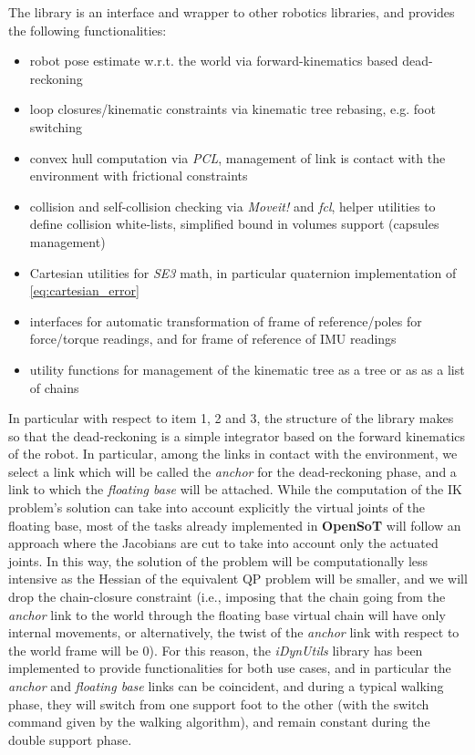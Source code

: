 The library is an interface and wrapper to other robotics libraries, and provides the following functionalities:
\begin{itemize}
\item robot pose estimate w.r.t. the world via forward-kinematics based dead-reckoning
\item loop closures/kinematic constraints via kinematic tree rebasing, e.g. foot switching
\item convex hull computation via \emph{PCL}, management of link is contact with the environment with frictional constraints
\item collision and self-collision checking via \emph{Moveit!} and \emph{fcl}, helper utilities to define collision white-lists, simplified bound in volumes support (capsules management)
\item Cartesian utilities for \emph{SE3} math, in particular quaternion implementation of \ref{eq:cartesian_error}
\item interfaces for automatic transformation of frame of reference/poles for force/torque readings, and for frame of reference of IMU readings
\item utility functions for management of the kinematic tree as a tree or as as a list of chains
\end{itemize}
In particular with respect to item 1, 2 and 3, the structure of the library makes so that the dead-reckoning is a simple integrator based on the forward kinematics of the robot.
In particular, among the links in contact with the environment, we select a link which will be called the  \emph{anchor} for the dead-reckoning phase, and a link to which the \emph{floating base} will be attached. While the computation of the IK problem's solution can take into account explicitly the virtual joints of the floating base, most of the tasks already implemented in \textbf{OpenSoT} will follow an approach where the Jacobians are cut to take into account only the actuated joints. In this way, the solution of the problem will be computationally less intensive as the Hessian of the equivalent QP problem will be smaller, and we will drop the chain-closure constraint (i.e., imposing that the chain going from the \emph{anchor} link to the world through the floating base virtual chain will have only internal movements, or alternatively, the twist of the \emph{anchor} link with respect to the world frame will be $0$). For this reason, the \emph{iDynUtils} library has been implemented to provide functionalities for both use cases, and in particular the \emph{anchor} and \emph{floating base} links can be coincident, and during a typical walking phase, they will switch from one support foot to the other (with the switch command given by the walking algorithm), and remain constant during the double support phase.

